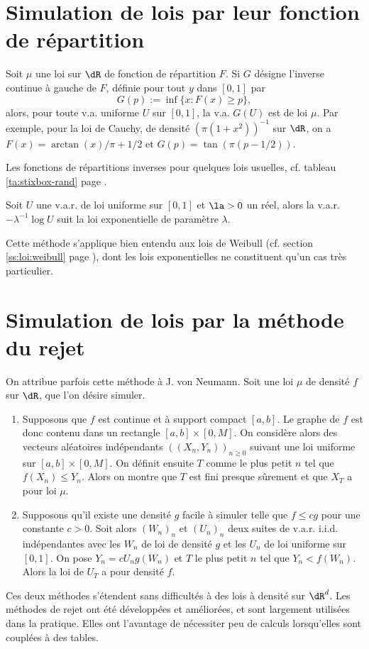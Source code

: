 %
\section{Simulation de lois par leur fonction de répartition}
%

Soit $\mu$ une loi sur $\dR$ de fonction de répartition $F$. Si $G$ désigne
l'inverse continue à gauche de $F$, définie pour tout $y$ dans $[0,1]$ par
$$
G(p):=\inf\{x:F(x)\geq p\},
$$
alors, pour toute v.a. uniforme $U$ sur $[0,1]$, la v.a. $G(U)$ est de loi
$\mu$. Par exemple, pour la loi de Cauchy, de densité $(\pi(1+x^2))^{-1}$ sur
$\dR$, on a $F(x)=\arctan(x)/\pi+1/2$ et $G(p)=\tan(\pi(p-1/2))$. 

Les fonctions de répartitions inverses pour quelques lois usuelles, cf. tableau \ref{ta:stixbox-rand} page
\pageref{ta:stixbox-rand}.

\begin{theorem}\label{th:simexp}
  Soit $U$ une v.a.r. de loi uniforme sur $[0,1]$ et $\la>0$ un réel, alors la
  v.a.r. $-\lambda^{-1} \log U$ suit la loi exponentielle de paramètre
  $\lambda$.
\end{theorem}
Cette méthode s'applique bien entendu aux lois de Weibull (cf. section
\ref{ss:loi:weibull} page \pageref{ss:loi:weibull}), dont les lois
exponentielles ne constituent qu'un cas très particulier. 


%
\section{Simulation de lois par la méthode du rejet}
%

On attribue parfois cette méthode à J. von Neumann. Soit une loi $\mu$ de
densité $f$ sur $\dR$, que l'on désire simuler.

\begin{enumerate}
\item Supposons que $f$ est continue et à support compact $[a,b]$. Le graphe
  de $f$ est donc contenu dans un rectangle $[a,b]× [0,M]$. On considère alors
  des vecteurs aléatoires indépendants $((X_n,Y_n))_{n\geq0}$ suivant une loi
  uniforme sur $[a,b]× [0,M]$. On définit ensuite $T$ comme le plus petit $n$
  tel que $f(X_n) \leq Y_n$. Alors on montre que $T$ est fini presque sûrement et
  que $X_T$ a pour loi $\mu$.
\item Supposons qu'il existe une densité $g$ facile à simuler telle que $f\leq c
  g$ pour une constante $c>0$. Soit alors $(W_n)_n$ et $(U_n)_n$ deux suites
  de v.a.r. i.i.d. indépendantes avec les $W_n$ de loi de densité $g$ et les
  $U_n$ de loi uniforme sur $[0,1]$.  On pose $Y_n=cU_ng(W_n)$ et $T$ le plus
  petit $n$ tel que $Y_n<f(W_n)$. Alors la loi de $U_{T}$ a pour densité $f$.
\end{enumerate}
Ces deux méthodes s'étendent sans difficultés à des lois à densité sur
$\dR^d$. Les méthodes de rejet ont été développées et améliorées, et sont
largement utilisées dans la pratique. Elles ont l'avantage de nécessiter peu
de calculs lorsqu'elles sont couplées à des tables. 

